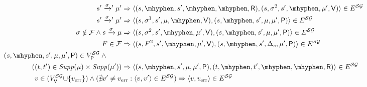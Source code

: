 \begin{definition}
{\begin{align*}
    s' \xrightarrowprime{\sigma} \mu'
    & \Rightarrow \tuple{(s, \mhyphen, s', \mhyphen, \mhyphen, \Refuter),(s, \sigma^{2}, s', \mhyphen, \mu', \Verifier)}\in E^\SymbG \\
    {s' \xrightarrowprime{\sigma} \mu'}
    & \Rightarrow \tuple{(s, \sigma^1, s', \mu, \mhyphen, \Verifier),(s, \mhyphen, s', \mu, \mu', \Probabilistic)}\in E^\SymbG \\
    {\sigma \notin \faults} \wedge {s \xrightarrow{\sigma} \mu}
    & \Rightarrow \tuple{(s, \sigma^2, s', \mhyphen, \mu', \Verifier), (s, \mhyphen, s', \mu, \mu', \Probabilistic)}\in E^\SymbG\\
    {F \in \faults}
    & \Rightarrow \tuple{(s, F^2, s', \mhyphen, \mu', \Verifier), (s, \mhyphen, s', \Dirac_s, \mu', \Probabilistic)}\in E^\SymbG \\
     (s, \mhyphen, s', \mu, \mu', \Probabilistic) \in V^\SymbG_\Probabilistic \wedge {} \qquad & \\ 
   ((t,t') \in \support{\mu}\times \support{\mu'})
    & \Rightarrow \tuple{(s, \mhyphen, s', \mu, \mu', \Probabilistic), (t, \mhyphen, t', \mhyphen, \mhyphen,  \Refuter)}\in E^\SymbG \\
    & \hspace{-12.4em} {v\in (V^\SymbG_\Verifier{\cup}\{\ErrorSt\})} \wedge {(\nexists {v'\neq\ErrorSt} : {\tuple{v,v'}\in E^\SymbG})}
    \Rightarrow  \tuple{v,\ErrorSt}\in E^\SymbG
  \end{align*}
  }%

\end{definition}

